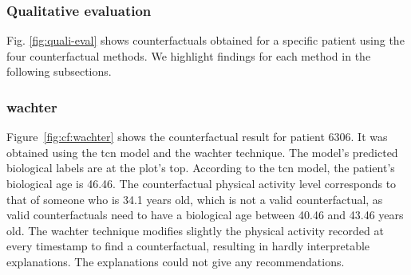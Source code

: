 \subsubsection{Qualitative evaluation}
 Fig. \ref{fig:quali-eval} shows counterfactuals obtained for a specific patient using the four counterfactual methods. We highlight findings for each method in the following subsections.

\subsubsection{\gls{wachter}}
Figure~\ref{fig:cf:wachter} shows the counterfactual result for patient 6306. It was obtained using the \gls{tcn} model and the \gls{wachter} technique. The model's predicted biological labels are at the plot's top. According to the \gls{tcn} model, the patient's biological age is 46.46.
The counterfactual physical activity level corresponds to that of someone who is 34.1 years old, which is not a valid counterfactual, as valid counterfactuals need to have a biological age between 40.46 and 43.46 years old. The \gls{wachter} technique modifies slightly the physical activity recorded at every timestamp to find a counterfactual, resulting in hardly interpretable explanations. The explanations could not give any recommendations.

